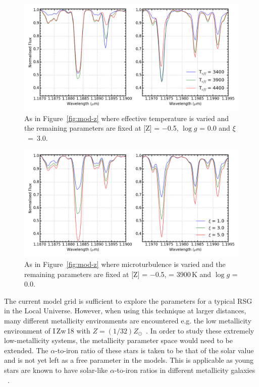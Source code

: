 \begin{figure}
 \centering
\includegraphics[width=\textwidth]{JAnal/varyTv2}
\caption{
As in Figure~\ref{fig:mod-z} where effective temperature is varied and the remaining parameters are fixed at [Z] = $-$0.5, $\log g$ = 0.0 and $\xi$~=~3.0\kms.\label{fig:mod-t}
         }
\end{figure}
\begin{figure}
 \centering
\includegraphics[width=\textwidth]{JAnal/varymicrov2}
\caption{
As in Figure~\ref{fig:mod-z} where microturbulence is varied and the remaining parameters are fixed at [Z] = $-$0.5, \Teff = 3900\,K and $\log g$ = 0.0.\label{fig:mod-micro}
         }
\end{figure}

The current model grid is sufficient to explore the parameters for a typical RSG in the Local Universe.
However, when using this technique at larger distances,
many different metallicity environments are encountered e.g. the low metallicity environment of I\,Zw\,18 with $Z=(1/32)Z_{\odot}$~\citep{1998ApJ...508..248V}.
In order to study these extremely low-metallicity systems,
the metallicity parameter space would need to be extended.
The $\alpha$-to-iron ratio of these stars is taken to be that of the solar value and is not yet left as a free parameter in the models.
This is applicable as young stars are known to have solar-like $\alpha$-to-iron ratios in different metallicity galaxies
~\citep[see tables 3 and 4 in][and references therein]{2015ApJ...806...21D}.

